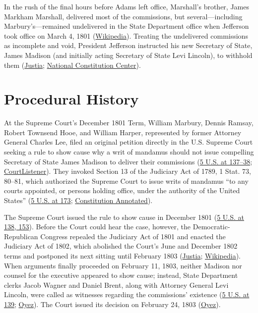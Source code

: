 \documentclass[12pt]{article}
\begin{document}
In the rush of the final hours before Adams left office, Marshall's brother, James Markham Marshall, delivered most of the commissions, but several---including Marbury's---remained undelivered in the State Department office when Jefferson took office on March 4, 1801 (\href{https://en.wikipedia.org/wiki/Marbury_v._Madison}{Wikipedia}). Treating the undelivered commissions as incomplete and void, President Jefferson instructed his new Secretary of State, James Madison (and initially acting Secretary of State Levi Lincoln), to withhold them (\href{https://supreme.justia.com/cases/federal/us/5/137/}{Justia}; \href{https://constitutioncenter.org/the-constitution/supreme-court-case-library/marbury-v-madison}{National Constitution Center}).

\section{Procedural History}

At the Supreme Court's December 1801 Term, William Marbury, Dennis Ramsay, Robert Townsend Hooe, and William Harper, represented by former Attorney General Charles Lee, filed an original petition directly in the U.S. Supreme Court seeking a rule to show cause why a writ of mandamus should not issue compelling Secretary of State James Madison to deliver their commissions (\href{https://supreme.justia.com/cases/federal/us/5/137/}{5 U.S. at 137--38}; \href{https://www.courtlistener.com/opinion/84759/marbury-v-madison/}{CourtListener}). They invoked Section 13 of the Judiciary Act of 1789, 1 Stat. 73, 80--81, which authorized the Supreme Court to issue writs of mandamus ``to any courts appointed, or persons holding office, under the authority of the United States'' (\href{https://supreme.justia.com/cases/federal/us/5/137/}{5 U.S. at 173}; \href{https://www.law.cornell.edu/constitution-conan/article-3/section-1/marbury-v-madison-and-judicial-review}{Constitution Annotated}).

The Supreme Court issued the rule to show cause in December 1801 (\href{https://supreme.justia.com/cases/federal/us/5/137/}{5 U.S. at 138, 153}). Before the Court could hear the case, however, the Democratic-Republican Congress repealed the Judiciary Act of 1801 and enacted the Judiciary Act of 1802, which abolished the Court's June and December 1802 terms and postponed its next sitting until February 1803 (\href{https://supreme.justia.com/cases/federal/us/5/137/}{Justia}; \href{https://en.wikipedia.org/wiki/Marbury_v._Madison}{Wikipedia}). When arguments finally proceeded on February 11, 1803, neither Madison nor counsel for the executive appeared to show cause; instead, State Department clerks Jacob Wagner and Daniel Brent, along with Attorney General Levi Lincoln, were called as witnesses regarding the commissions' existence (\href{https://supreme.justia.com/cases/federal/us/5/137/}{5 U.S. at 139}; \href{https://www.oyez.org/cases/1789-1850/5us137}{Oyez}). The Court issued its decision on February 24, 1803 (\href{https://www.oyez.org/cases/1789-1850/5us137}{Oyez}).
\end{document}
